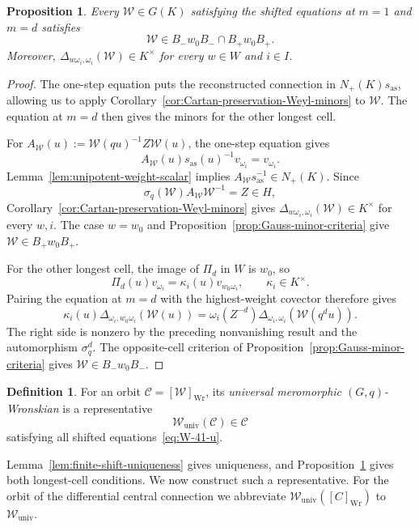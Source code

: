 \documentclass[11pt,leqno]{amsart}
\numberwithin{equation}{section}
\theoremstyle{plain}
\newtheorem{proposition}[theorem]{Proposition}
\theoremstyle{definition}
\newtheorem{definition}[theorem]{Definition}
\theoremstyle{plain}
\theoremstyle{definition}
\theoremstyle{remark}
\begin{document}
\begin{proposition}\label{prop:shifted-Wronskian-longest-cells}
Every $\mathscr W\in G(K)$ satisfying the shifted equations at $m=1$ and $m=d$ satisfies
\begin{equation}\label{eq:W-universal-u}
 \mathscr W\in B_-w_0B_-\cap B_+w_0B_+.
\end{equation}
Moreover, $\Delta_{w\omega_i,\omega_i}(\mathscr W)\in K^\times$ for every $w\in W$ and $i\in I$.
\end{proposition}
\begin{proof}
The one-step equation puts the reconstructed connection in $N_+(K)s_{\mathrm{as}}$, allowing us to apply Corollary~\ref{cor:Cartan-preservation-Weyl-minors} to $\mathscr W$.  The equation at $m=d$ then gives the minors for the other longest cell.

For $A_{\mathscr W}(u):=\mathscr W(qu)^{-1}Z\mathscr W(u)$, the one-step equation gives
\[
 A_{\mathscr W}(u)s_{\mathrm{as}}(u)^{-1}v_{\omega_i}=v_{\omega_i}.
\]
Lemma~\ref{lem:unipotent-weight-scalar} implies $A_{\mathscr W}s_{\mathrm{as}}^{-1}\in N_+(K)$.  Since
\[
 \sigma_q(\mathscr W)A_{\mathscr W}\mathscr W^{-1}=Z\in H,
\]
Corollary~\ref{cor:Cartan-preservation-Weyl-minors} gives $\Delta_{w\omega_i,\omega_i}(\mathscr W)\in K^\times$ for every $w,i$.  The case $w=w_0$ and Proposition~\ref{prop:Gauss-minor-criteria} give $\mathscr W\in B_+w_0B_+$.

For the other longest cell, the image of $\Pi_d$ in $W$ is $w_0$, so
\begin{equation}\label{eq:Pi-d-longest-weight-vector}
 \Pi_d(u)v_{\omega_i}=\kappa_i(u)v_{w_0\omega_i},
 \qquad \kappa_i\in K^\times.
\end{equation}
Pairing the equation at $m=d$ with the highest-weight covector therefore gives
\begin{equation}\label{eq:terminal-opposite-minor}
 \kappa_i(u)\Delta_{\omega_i,w_0\omega_i}(\mathscr W(u))
 =\omega_i(Z^{-d})\Delta_{\omega_i,\omega_i}(\mathscr W(q^du)).
\end{equation}
The right side is nonzero by the preceding nonvanishing result and the automorphism $\sigma_q^d$.  The opposite-cell criterion of Proposition~\ref{prop:Gauss-minor-criteria} gives $\mathscr W\in B_-w_0B_-$.
\end{proof}

\begin{definition}\label{def:universal-Wronskian-notation}
For an orbit $\mathcal C=[\mathscr W]_{\mathrm{Wr}}$, its \emph{universal meromorphic $(G,q)$-Wronskian} is a representative
\[
 \mathscr W_{\mathrm{univ}}(\mathcal C)\in\mathcal C
\]
satisfying all shifted equations~\eqref{eq:W-41-u}.
\end{definition}
Lemma~\ref{lem:finite-shift-uniqueness} gives uniqueness, and Proposition~\ref{prop:shifted-Wronskian-longest-cells} gives both longest-cell conditions.  We now construct such a representative.  For the orbit of the differential central connection we abbreviate $\mathscr W_{\mathrm{univ}}([C]_{\mathrm{Wr}})$ to $\mathscr W_{\mathrm{univ}}$.
\end{document}
